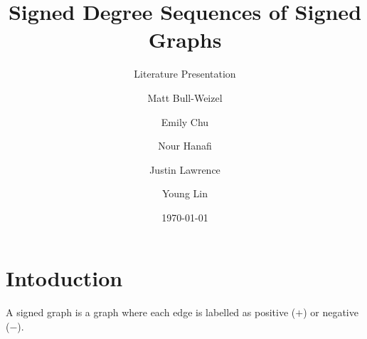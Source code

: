 \documentclass{beamer}
\title{Signed Degree Sequences of Signed Graphs}
\subtitle{Literature Presentation}
\author[]{Matt Bull-Weizel \and Emily Chu \and Nour Hanafi \and Justin Lawrence \and Young Lin}
\institute{UBC}
\date{\today}
\begin{document}
\begin{frame}
\titlepage
\end{frame}

\section{Intoduction}
\begin{frame}
    \begin{definition}
        A signed graph is a graph where each edge is labelled as positive ($+$) or negative ($-$).
    \end{definition}
\end{frame}



\end{document}
